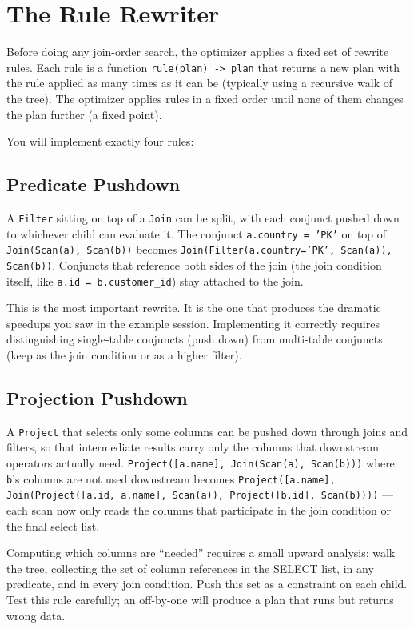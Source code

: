 \documentclass[11pt,a4paper]{article}
\begin{document}
\section{The Rule Rewriter}

Before doing any join-order search, the optimizer applies a fixed set of rewrite rules. Each rule is a function \texttt{rule(plan) -> plan} that returns a new plan with the rule applied as many times as it can be (typically using a recursive walk of the tree). The optimizer applies rules in a fixed order until none of them changes the plan further (a fixed point).

You will implement exactly four rules:

\subsection{Predicate Pushdown}
A \texttt{Filter} sitting on top of a \texttt{Join} can be split, with each conjunct pushed down to whichever child can evaluate it. The conjunct \texttt{a.country = 'PK'} on top of \texttt{Join(Scan(a), Scan(b))} becomes \texttt{Join(Filter(a.country='PK', Scan(a)), Scan(b))}. Conjuncts that reference both sides of the join (the join condition itself, like \texttt{a.id = b.customer\_id}) stay attached to the join.

This is the most important rewrite. It is the one that produces the dramatic speedups you saw in the example session. Implementing it correctly requires distinguishing single-table conjuncts (push down) from multi-table conjuncts (keep as the join condition or as a higher filter).

\subsection{Projection Pushdown}
A \texttt{Project} that selects only some columns can be pushed down through joins and filters, so that intermediate results carry only the columns that downstream operators actually need. \texttt{Project([a.name], Join(Scan(a), Scan(b)))} where \texttt{b}'s columns are not used downstream becomes \texttt{Project([a.name], Join(Project([a.id, a.name], Scan(a)), Project([b.id], Scan(b))))} --- each scan now only reads the columns that participate in the join condition or the final select list.

Computing which columns are ``needed'' requires a small upward analysis: walk the tree, collecting the set of column references in the SELECT list, in any predicate, and in every join condition. Push this set as a constraint on each child. Test this rule carefully; an off-by-one will produce a plan that runs but returns wrong data.
\end{document}
